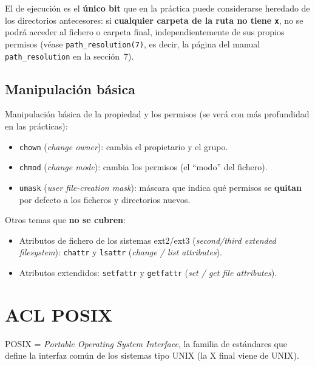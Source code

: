\documentclass[11pt,a4paper]{report}
\begin{document}
\begin{importante}[title={El bit \texttt{x} se ``hereda'' de los directorios}]
El de ejecución es el \textbf{único bit} que en la práctica puede considerarse heredado de los directorios antecesores: si \textbf{cualquier carpeta de la ruta no tiene \texttt{x}}, no se podrá acceder al fichero o carpeta final, independientemente de sus propios permisos (véase \texttt{path\_resolution(7)}, es decir, la página del manual \texttt{path\_resolution} en la sección~7).
\end{importante}
 
\section{Manipulación básica}
 
Manipulación básica de la propiedad y los permisos (se verá con más profundidad en las prácticas):
\begin{itemize}
  \item \texttt{chown} (\emph{change owner}): cambia el propietario y el grupo.
  \item \texttt{chmod} (\emph{change mode}): cambia los permisos (el ``modo'' del fichero).
  \item \texttt{umask} (\emph{user file-creation mask}): máscara que indica qué permisos se \textbf{quitan} por defecto a los ficheros y directorios nuevos.
\end{itemize}
 
Otros temas que \textbf{no se cubren}:
\begin{itemize}
  \item Atributos de fichero de los sistemas ext2/ext3 (\emph{second/third extended filesystem}): \texttt{chattr} y \texttt{lsattr} (\emph{change / list attributes}).
  \item Atributos extendidos: \texttt{setfattr} y \texttt{getfattr} (\emph{set / get file attributes}).
\end{itemize}
 
\chapter{ACL POSIX}
 
POSIX = \emph{Portable Operating System Interface}, la familia de estándares que define la interfaz común de los sistemas tipo UNIX (la X final viene de UNIX).
 
\end{document}
